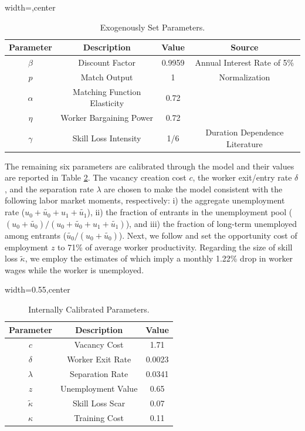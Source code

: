 \documentclass[12pt]{article} %
\theoremstyle{definition}
\begin{document}
\begin{table}[h!]
\centering 
\begin{adjustbox}{width=\columnwidth,center}
 \begin{tabular}{||c c c c||} 
 \hline
 \textbf{Parameter} & \textbf{Description} & \textbf{Value} & \textbf{Source} \\ 
 \hline\hline
  $\beta$ & Discount Factor & 0.9959 & Annual Interest Rate of 5\% \\ 
   $p$ & Match Output &  1 & Normalization \\
 $\alpha$ & Matching Function Elasticity & 0.72 & \cite{shimer2005cyclical} \\
   $\eta$ & Worker Bargaining Power  & 0.72 & \cite{shimer2005cyclical} \\
  $\gamma$ & Skill Loss Intensity & 1/6 &  Duration Dependence Literature \\ [1ex] 
 \hline
 \end{tabular}
\end{adjustbox}
\caption{Exogenously Set Parameters.} \label{table_set_parameters}
\end{table} 

The remaining six parameters are calibrated through the model and their values are reported in Table \ref{table_calibrated_parameters}.
The vacancy creation cost $c$, the worker exit/entry rate $\delta$, and the separation rate $\lambda$ are chosen to make the model consistent with the following labor market moments, respectively: i) the aggregate unemployment rate ($u_{0} + \tilde{u_{0}} + u_{1} + \tilde{u_{1}}$), ii) the fraction of entrants in the unemployment pool ($(u_{0} + \tilde{u_{0}})/(u_{0} + \tilde{u_{0}} + u_{1} + \tilde{u_{1}})$), and iii) the fraction of long-term unemployed among entrants ($\tilde{u_{0}}/(u_{0} + \tilde{u_{0}})$).
Next, we follow \cite{hall2008limited} and set the opportunity cost of employment $z$ to 71\% of average worker productivity.
Regarding the size of skill loss $\tilde{\kappa}$, we employ the estimates of \cite{ortego2016unemployment, ortego2017loss} which imply a monthly 1.22\% drop in worker wages while the worker is unemployed.

\begin{table}[h!]
\centering
\begin{adjustbox}{width=0.55\columnwidth,center}
 \begin{tabular}{||c c c||} 
 \hline
 \textbf{Parameter} & \textbf{Description} & \textbf{Value} \\  
 \hline\hline
  $c$ & Vacancy Cost & 1.71  \\
  $\delta$  & Worker Exit Rate    & 0.0023   \\ 
  $\lambda$  & Separation Rate    & 0.0341  \\
  $z$ & Unemployment Value  & 0.65  \\
  $ \tilde{\kappa}$  & Skill Loss Scar & 0.07 \\ 
   $\kappa$  & Training Cost & 0.11 \\ [1ex] 
 \hline
 \end{tabular}
\end{adjustbox}
  \caption{Internally Calibrated Parameters.} \label{table_calibrated_parameters}
\end{table}
\end{document}
